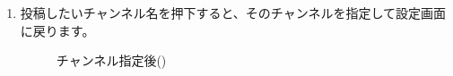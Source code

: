 \begin{enumerate}
        \newpage
        \item 投稿したいチャンネル名を押下すると、そのチャンネルを指定して設定画面に戻ります。
            \begin{figure}[htbp]
                \centering
                \caption{チャンネル指定後(\currentVersion)}
                \label{img:guide6}
            \end{figure}
    \end{enumerate}
